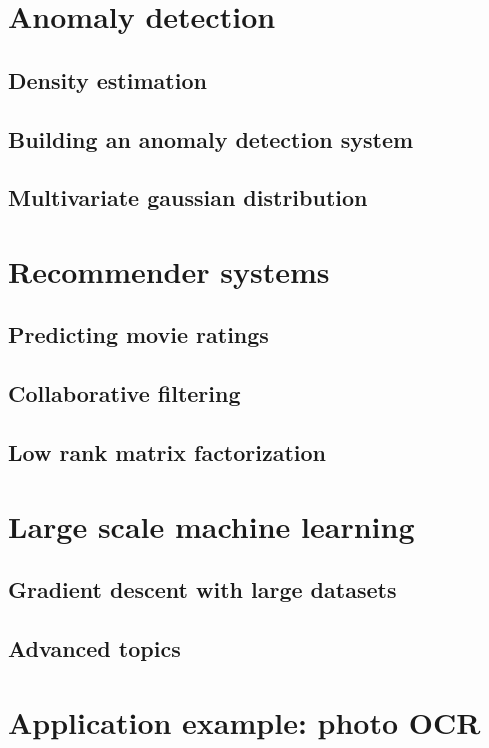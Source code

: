 	\section{Anomaly detection}
	\subsection{Density estimation}
	\subsection{Building an anomaly detection system}
	\subsection{Multivariate gaussian distribution}

	\section{Recommender systems}
	\subsection{Predicting movie ratings}
	\subsection{Collaborative filtering}
	\subsection{Low rank matrix factorization}

	\section{Large scale machine learning}
	\subsection{Gradient descent with large datasets}
	\subsection{Advanced topics}

	\section{Application example: photo OCR}


